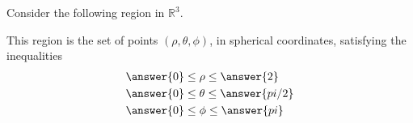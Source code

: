 \begin{problem}
Consider the following region in $\mathbb{R}^3$.

\begin{image}
\end{image}

This region is the set of points $(\rho,\theta,\phi)$, in spherical coordinates, satisfying the inequalities
\begin{align*}
&\answer{0}\leq\rho\leq \answer{2}\\
&\answer{0}\leq\theta\leq\answer{pi/2}\\
&\answer{0}\leq\phi\leq\answer{pi}
\end{align*}

\end{problem}